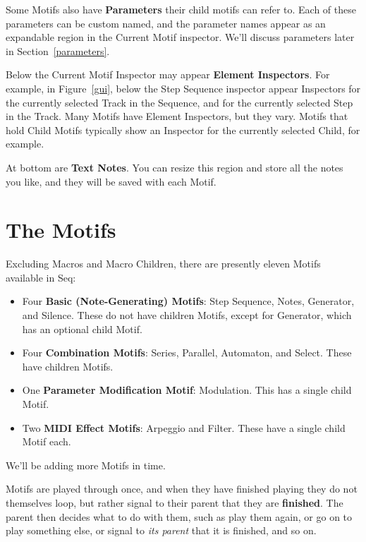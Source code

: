 \documentclass[twoside,10pt]{article}
\begin{document}
Some Motifs also have {\bf Parameters} their child motifs can refer to.  Each of these parameters can be custom named, and the parameter names appear as an expandable region in the Current Motif inspector.  We'll discuss parameters later in Section~\ref{parameters}.

Below the Current Motif Inspector may appear {\bf Element Inspectors}.  For example, in Figure~\ref{gui}, below the Step Sequence inspector appear Inspectors for the currently selected Track in the Sequence, and for the currently selected Step in the Track.  Many Motifs have Element Inspectors, but they vary.  Motifs that hold Child Motifs typically show an Inspector for the currently selected Child, for example.

At bottom are {\bf Text Notes}.  You can resize this region and store all the notes you like, and they will be saved with each Motif.

\clearpage\section{The Motifs}
\label{motifs}

Excluding Macros and Macro Children, there are presently eleven Motifs available in Seq:

\begin{itemize}
\item Four {\bf Basic (Note-Generating) Motifs}: Step Sequence, Notes, Generator, and Silence.  These do not have children Motifs, except for Generator, which has an optional child Motif.
\item Four {\bf Combination Motifs}: Series, Parallel, Automaton, and Select.  These have children Motifs.
\item One {\bf Parameter Modification Motif}: Modulation.  This has a single child Motif.
\item Two {\bf MIDI Effect Motifs}: Arpeggio and Filter.  These have a single child Motif each.
\end{itemize}

We'll be adding more Motifs in time.

\vspace{1em}

Motifs are played through once, and when they have finished playing they do not themselves loop, but rather signal to their parent that they are {\bf finished}.  The parent then decides what to do with them, such as play them again, or go on to play something else, or signal to {\it its parent} that it is finished, and so on.
\end{document}
